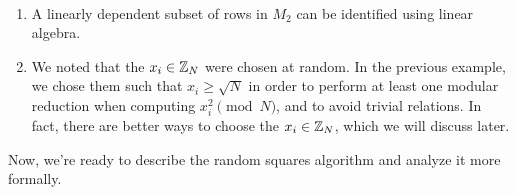 \begin{remark}~
    \begin{enumerate}[(1)]
        \item A linearly dependent subset of rows in $M_2$ can be identified 
        using linear algebra. 
        \item We noted that the $x_i \in \mathbb{Z}_N$ were chosen at random. In the 
        previous example, we chose them such that $x_i \geq \sqrt N$ 
        in order to perform at least one modular reduction when computing 
        $x_i^2 \pmod N$, and to avoid trivial relations. In fact, there 
        are better ways to choose the $x_i \in \mathbb{Z}_N$, which we will discuss later. 
    \end{enumerate}
\end{remark}

Now, we're ready to describe the random squares algorithm and analyze it more 
formally. 

